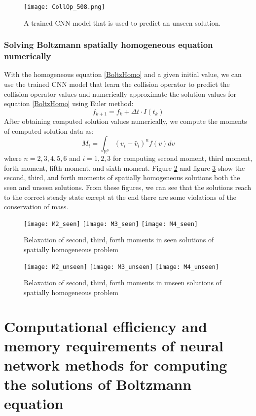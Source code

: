 \documentclass{article}
\begin{document}
\begin{figure}[h]
	\centering
	\texttt{[image: CollOp\_508.png]}
	\caption{A trained CNN model that is used to predict an unseen solution.}
	\label{fig:CollOp_508}
\end{figure}

\subsubsection{Solving Boltzmann spatially homogeneous equation numerically}
With the homogeneous equation \ref{BoltzHomo} and a given initial value, we can use  the trained CNN model that learn the collision operator to predict the collision operator values and  numerically approximate the solution values for equation \ref{BoltzHomo} using Euler method:
\begin{equation}
f_{k+1}= f_k + \Delta t \cdot I(t_k)
\end{equation}
After obtaining computed solution values numerically, we compute the moments of computed solution data as:
\begin{equation}
M_i = \int_{\mathbb{R}^3} (v_i - \tilde{v_i})^n f(v)dv
\end{equation}
where $n=2,3,4,5,6$ and $i=1,2,3$ for computing second moment, third moment, forth moment, fifth moment, and sixth moment. Figure \ref{fig:Moments_seen} and figure \ref{fig:Moments_unseen} show the second, third, and forth moments of spatially homogeneous solutions both the seen and unseen solutions. From these figures, we can see that the solutions reach to the correct steady state except at the end there are some violations of the conservation of mass.

\begin{figure}[h]
	\texttt{[image: M2\_seen]}
	\hfill
	\texttt{[image: M3\_seen]}
	\hfill
	\texttt{[image: M4\_seen]}
	\caption{Relaxation of second, third, forth moments in seen solutions of spatially homogeneous problem}
	\label{fig:Moments_seen}	
\end{figure}

\begin{figure}[h]
	\texttt{[image: M2\_unseen]}
	\hfill
	\texttt{[image: M3\_unseen]}
	\hfill
	\texttt{[image: M4\_unseen]}
	\caption{Relaxation of second, third, forth moments in unseen solutions of spatially homogeneous problem}
	\label{fig:Moments_unseen}	
\end{figure}

\section{Computational efficiency and memory requirements of neural network methods for computing the solutions of Boltzmann equation } \label{efficiency}
\end{document}

